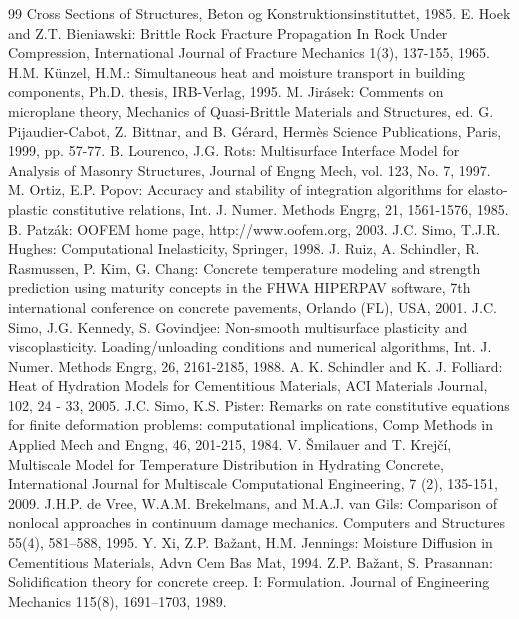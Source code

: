 \documentclass[a4paper]{article}
\begin{document}
\begin{thebibliography}{99}
  Cross Sections of Structures, Beton og Konstruktionsinstituttet, 1985.
 E. Hoek and Z.T. Bieniawski: Brittle Rock Fracture Propagation
In Rock Under Compression, International Journal of Fracture Mechanics
1(3), 137-155, 1965.
 H.M. K{\"u}nzel, H.M.: Simultaneous heat and
  moisture transport in building components, Ph.D. thesis, IRB-Verlag,
  1995.
 M. Jir\'{a}sek: Comments on microplane theory, Mechanics of Quasi-Brittle Materials and Structures, ed. G. Pijaudier-Cabot, Z. Bittnar, and B. G\'{e}rard, Herm\`{e}s Science Publications, Paris, 1999, pp. 57-77.
 B. Lourenco, J.G. Rots: Multisurface Interface Model for Analysis of Masonry Structures, Journal of Engng Mech, vol. 123, No. 7, 1997.
 M. Ortiz, E.P. Popov: Accuracy and stability of integration algorithms for elasto-plastic constitutive relations, Int. J. Numer. Methods Engrg, 21, 1561-1576, 1985.
 B. Patz\'ak: OOFEM home page, http://www.oofem.org, 2003.
 J.C. Simo, T.J.R. Hughes: Computational Inelasticity, Springer, 1998.
 J. Ruiz, A. Schindler, R. Rasmussen, P. Kim, G. Chang: Concrete temperature modeling and strength prediction using maturity concepts in the FHWA HIPERPAV software, 7th international conference on concrete pavements, Orlando (FL), USA, 2001.
 J.C. Simo, J.G. Kennedy, S. Govindjee: Non-smooth multisurface plasticity and viscoplasticity. Loading/unloading conditions and numerical algorithms, Int. J. Numer. Methods Engrg, 26, 2161-2185, 1988.
 A. K. Schindler and K. J. Folliard: Heat of Hydration Models for Cementitious Materials, ACI Materials Journal, 102, 24 - 33, 2005.
 J.C. Simo, K.S. Pister: Remarks on rate constitutive equations for finite deformation problems: computational implications, Comp Methods in Applied Mech and Engng, 46, 201-215, 1984.
 V. \v{S}milauer and T. Krej\v{c}\'i, Multiscale
  Model for Temperature Distribution in Hydrating Concrete,
  International Journal for Multiscale Computational Engineering, 7
  (2), 135-151, 2009.
 J.H.P. de Vree, W.A.M. Brekelmans, and M.A.J. van Gils: Comparison of nonlocal approaches in continuum damage mechanics. Computers and Structures 55(4), 581–588, 1995.
 Y. Xi, Z.P. Ba\v{z}ant, H.M. Jennings: Moisture Diffusion
  in Cementitious Materials, Advn Cem Bas Mat, 1994.
 Z.P. Ba\v{z}ant, S. Prasannan: Solidification theory for concrete creep. {I}: Formulation. Journal of Engineering Mechanics 115(8), 1691–1703, 1989.

\end{thebibliography}
\end{document}
